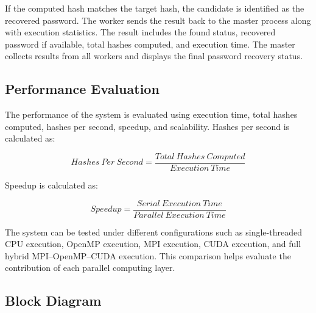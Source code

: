 \documentclass[12pt,a4paper]{article}
\begin{document}
If the computed hash matches the target hash, the candidate is identified as the recovered password. The worker sends the result back to the master process along with execution statistics. The result includes the found status, recovered password if available, total hashes computed, and execution time. The master collects results from all workers and displays the final password recovery status.

\subsection{Performance Evaluation}

The performance of the system is evaluated using execution time, total hashes computed, hashes per second, speedup, and scalability. Hashes per second is calculated as:

\[
Hashes\ Per\ Second = \frac{Total\ Hashes\ Computed}{Execution\ Time}
\]

Speedup is calculated as:

\[
Speedup = \frac{Serial\ Execution\ Time}{Parallel\ Execution\ Time}
\]

The system can be tested under different configurations such as single-threaded CPU execution, OpenMP execution, MPI execution, CUDA execution, and full hybrid MPI--OpenMP--CUDA execution. This comparison helps evaluate the contribution of each parallel computing layer.

\subsection{Block Diagram}
\end{document}
